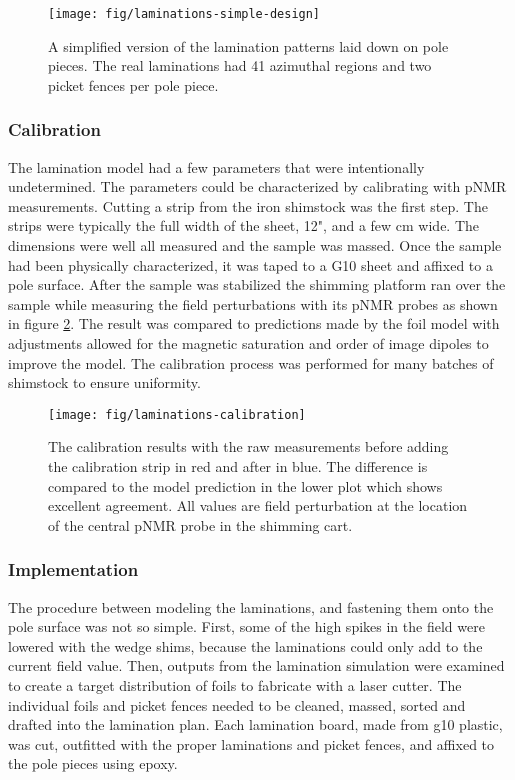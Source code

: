 \begin{figure}
\label{fig:laminations-simple-design}
\texttt{[image: fig/laminations-simple-design]}
\caption{A simplified version of the lamination patterns laid down on pole pieces.  The real laminations had 41 azimuthal regions and two picket fences per pole piece.}
\end{figure}

\subsubsection{Calibration}

The lamination model had a few parameters that were intentionally undetermined.  The parameters could be characterized by calibrating with pNMR measurements.  Cutting a strip from the iron shimstock was the first step.  The strips were typically the full width of the sheet, 12", and a few \si{\centi\meter} wide.  The dimensions were well all measured and the sample was massed.  Once the sample had been physically characterized, it was taped to a G10 sheet and affixed to a pole surface.  After the sample was stabilized the shimming platform ran over the sample while measuring the field perturbations with its pNMR probes as shown in figure \ref{fig:laminations-calibration}.  The result was compared to predictions made by the foil model with adjustments allowed for the magnetic saturation and order of image dipoles to improve the model.  The calibration process was performed for many batches of shimstock to ensure uniformity.

\begin{figure}
\label{fig:laminations-calibration}
\texttt{[image: fig/laminations-calibration]}
\caption{The calibration results with the raw measurements before adding the calibration strip in red and after in blue.  The difference is compared to the model prediction in the lower plot which shows excellent agreement.  All values are field perturbation at the location of the central pNMR probe in the shimming cart.}
\end{figure}

\subsubsection{Implementation}

The procedure between modeling the laminations, and fastening them onto the pole surface was not so simple.  First, some of the high spikes in the field were lowered with the wedge shims, because the laminations could only add to the current field value.  Then, outputs from the lamination simulation were examined to create a target distribution of foils to fabricate with a laser cutter.  The individual foils and picket fences needed to be cleaned, massed, sorted and drafted into the lamination plan.  Each lamination board, made from g10 plastic, was cut, outfitted with the proper laminations and picket fences, and affixed to the pole pieces using epoxy.

